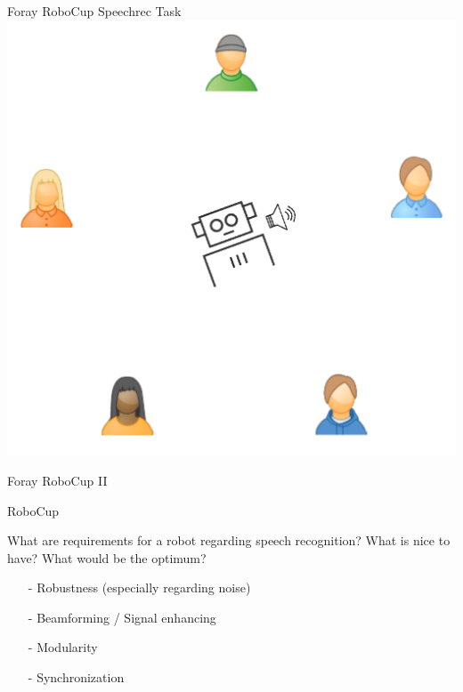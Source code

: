 \documentclass{beamer}
\begin{document}
	\begin{frame}{Foray RoboCup Speechrec Task}
		\centering
		\includegraphics[width=.75\textwidth]{Bilder/robocup_task_2}
	\end{frame}
	
	\begin{frame}{Foray RoboCup II}
		\centering
	\end{frame}
	
	\begin{frame}{RoboCup}
		\begin{alertblock}{What are requirements for a robot regarding speech recognition? What is nice to have? What would be the optimum?}
			\pause
			\begin{itemize}
				\item[-] Robustness (especially regarding noise)
				\item[-] Beamforming / Signal enhancing
				\item[-] Modularity
				\item[-] Synchronization
			\end{itemize}
		\end{alertblock}
	\end{frame}
	
\end{document}
